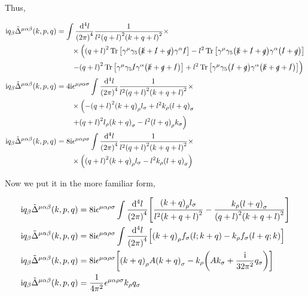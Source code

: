 Thus,

\begin{align}
    \textnormal{i} q_\beta{\tilde\Delta}^{\mu\alpha\beta}\qty(k,p,q)&=
    \int\frac{\dd[4]{l}}{\qty(2\pi)^4}\frac{1}{l^2\qty(q+l)^2\qty(k+q+l)^2}\times\nonumber\\
    &\quad\quad\times\left(
    \qty(q+l)^2\Tr\qty[\gamma^\mu\gamma_5\qty(\slashed {k}+\slashed{l}+\slashed q)\gamma^\alpha\slashed {l}]
    -l^2\Tr\qty[\gamma^\mu\gamma_5\qty(\slashed {k}+\slashed{l}+\slashed q)\gamma^\alpha\qty(\slashed {l}+\slashed q)]\right.\nonumber\\
    &\quad\quad\left.-\qty(q+l)^2\Tr\qty[\gamma^\mu\gamma_5\slashed {l}\gamma^\alpha \qty(\slashed {k}+\slashed{q}+\slashed l)]
    +l^2\Tr\qty[\gamma^\mu\gamma_5\qty(\slashed {l}+\slashed q)\gamma^\alpha \qty(\slashed {k}+\slashed{q}+\slashed l)]\right)\nonumber\\
    \textnormal{i} q_\beta{\tilde\Delta}^{\mu\alpha\beta}\qty(k,p,q)&=4\textnormal{i}\epsilon^{\mu\rho\alpha\sigma}
    \int\frac{\dd[4]{l}}{\qty(2\pi)^4}\frac{1}{l^2\qty(q+l)^2\qty(k+q+l)^2}\times\nonumber\\
    &\quad\quad\times\left(
    -\qty(q+l)^2\qty( {k}+ q)_\rho{l}_\sigma
    +l^2k_\rho\qty({l}+q)_\sigma\right.\nonumber\\
    &\quad\quad\left.+\qty(q+l)^2 {l}_\rho \qty( {k}+{q})_\sigma
    -l^2\qty( {l}+ q)_\rho k_\sigma\right)\nonumber\\
    \textnormal{i} q_\beta{\tilde\Delta}^{\mu\alpha\beta}\qty(k,p,q)&=8\textnormal{i}\epsilon^{\mu\alpha\rho\sigma}
    \int\frac{\dd[4]{l}}{\qty(2\pi)^4}\frac{1}{l^2\qty(q+l)^2\qty(k+q+l)^2}\times\nonumber\\
    &\quad\quad\times\left(
    \qty(q+l)^2\qty( {k}+ q)_\rho{l}_\sigma
    -l^2k_\rho\qty({l}+q)_\sigma\right)\nonumber
\end{align}

Now we put it in the more familiar form,

\begin{align}
    \textnormal{i} q_\beta{\tilde\Delta}^{\mu\alpha\beta}\qty(k,p,q)&=8\textnormal{i}\epsilon^{\mu\alpha\rho\sigma}
    \int\frac{\dd[4]{l}}{\qty(2\pi)^4}\qty[
        \frac{\qty( {k}+ q)_\rho{l}_\sigma}{l^2\qty(k+q+l)^2}
        -\frac{k_\rho\qty({l}+q)_\sigma}{\qty(q+l)^2\qty(k+q+l)^2}]\nonumber\\
        \textnormal{i} q_\beta{\tilde\Delta}^{\mu\alpha\beta}\qty(k,p,q)&=8\textnormal{i}\epsilon^{\mu\alpha\rho\sigma}
    \int\frac{\dd[4]{l}}{\qty(2\pi)^4}\qty[
        \qty( {k}+ q)_\rho f_\sigma\qty(l;k+q)
        -k_\rho f_\sigma\qty(l+q;k)]\nonumber\\
        \textnormal{i} q_\beta{\tilde\Delta}^{\mu\alpha\beta}\qty(k,p,q)&=8\textnormal{i}\epsilon^{\mu\alpha\rho\sigma}
    \qty[
        \qty( {k}+ q)_\rho A\qty(k+q)_\sigma
        -k_\rho\qty(A k_\sigma+\frac{\textnormal{i}}{32\pi^2}q_\sigma)]\nonumber\\
        \textnormal{i} q_\beta{\tilde\Delta}^{\mu\alpha\beta}\qty(k,p,q)&=\frac{1}{4\pi^2}\epsilon^{\mu\alpha\rho\sigma}
    k_\rho q_\sigma\nonumber
\end{align}

